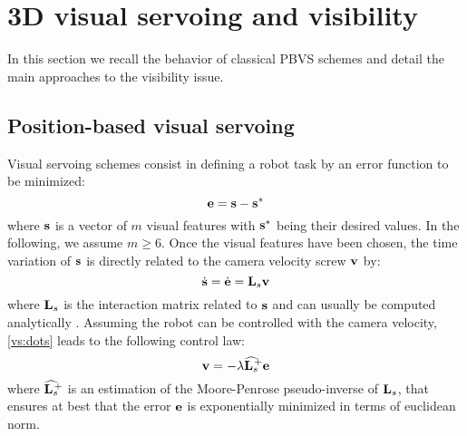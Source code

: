 \documentclass[letterpaper, 10 pt, conference]{IEEEtran}  %
\begin{document}

\section{3D visual servoing and visibility}\label{sec:pbvs}

In this section we recall the behavior of classical PBVS schemes and detail the main approaches to the visibility issue.

\subsection{Position-based visual servoing}

Visual servoing schemes consist in defining a robot task by an error function to be minimized:
\begin{equation}\label{vs:error}
 \e = \s - \sd
\end{equation}where $\mathbf{s}$ is a vector of $m$ visual features with $\mathbf{s}^*$ being their desired values. In the following, we assume $m\ge6$.
Once the visual features have been chosen, the time variation of $\mathbf{s}$ is directly related to the camera velocity screw $\mathbf{v}$ by:
\begin{equation}\label{vs:dots}
 \dot\s = \dot\e = \Ls \v
\end{equation}where $\Ls$ is the interaction matrix related to $\mathbf{s}$ and can usually be computed analytically \cite{2006_mra_chaumette}.
Assuming the robot can be controlled with the camera velocity, \eqref{vs:dots} leads to the following control law:
\begin{equation}\label{vs:law}
 \v = -\lambda \LsP \e
\end{equation}where $\LsP$ is an estimation of the Moore-Penrose pseudo-inverse of $\Ls$, that ensures at best that the error $\mathbf{e}$ is exponentially minimized in terms of euclidean norm.
\end{document}
